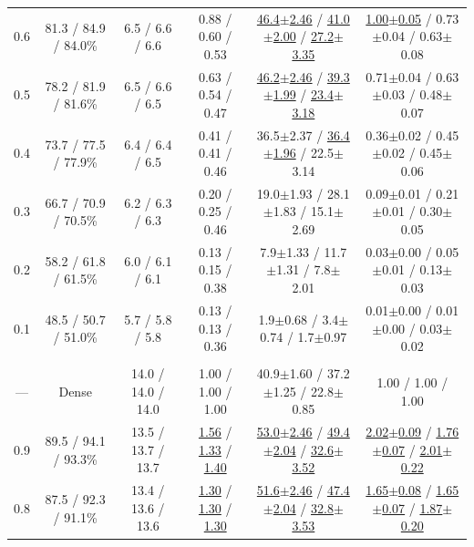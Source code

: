 \begin{table}[!t]
\begin{tabular}{c c c c c c}
0.6 & 81.3 / 84.9 / 84.0\% & 6.5 / 6.6 / 6.6 & 0.88 / 0.60 / 0.53 & \underline{46.4{\scriptsize$\pm$2.46}} / \underline{41.0{\scriptsize$\pm$2.00}} / \underline{27.2{\scriptsize$\pm$3.35}} & \underline{1.00{\scriptsize$\pm$0.05}} / 0.73{\scriptsize$\pm$0.04} / 0.63{\scriptsize$\pm$0.08} \\
0.5 & 78.2 / 81.9 / 81.6\% & 6.5 / 6.6 / 6.5 & 0.63 / 0.54 / 0.47 & \underline{46.2{\scriptsize$\pm$2.46}} / \underline{39.3{\scriptsize$\pm$1.99}} / \underline{23.4{\scriptsize$\pm$3.18}} & 0.71{\scriptsize$\pm$0.04} / 0.63{\scriptsize$\pm$0.03} / 0.48{\scriptsize$\pm$0.07} \\
0.4 & 73.7 / 77.5 / 77.9\% & 6.4 / 6.4 / 6.5 & 0.41 / 0.41 / 0.46 & 36.5{\scriptsize$\pm$2.37} / \underline{36.4{\scriptsize$\pm$1.96}} / 22.5{\scriptsize$\pm$3.14} & 0.36{\scriptsize$\pm$0.02} / 0.45{\scriptsize$\pm$0.02} / 0.45{\scriptsize$\pm$0.06} \\
0.3 & 66.7 / 70.9 / 70.5\% & 6.2 / 6.3 / 6.3 & 0.20 / 0.25 / 0.46 & 19.0{\scriptsize$\pm$1.93} / 28.1{\scriptsize$\pm$1.83} / 15.1{\scriptsize$\pm$2.69} & 0.09{\scriptsize$\pm$0.01} / 0.21{\scriptsize$\pm$0.01} / 0.30{\scriptsize$\pm$0.05} \\
0.2 & 58.2 / 61.8 / 61.5\% & 6.0 / 6.1 / 6.1 & 0.13 / 0.15 / 0.38 & 7.9{\scriptsize$\pm$1.33} / 11.7{\scriptsize$\pm$1.31} / 7.8{\scriptsize$\pm$2.01} & 0.03{\scriptsize$\pm$0.00} / 0.05{\scriptsize$\pm$0.01} / 0.13{\scriptsize$\pm$0.03} \\
0.1 & 48.5 / 50.7 / 51.0\% & 5.7 / 5.8 / 5.8 & 0.13 / 0.13 / 0.36 & 1.9{\scriptsize$\pm$0.68} / 3.4{\scriptsize$\pm$0.74} / 1.7{\scriptsize$\pm$0.97} & 0.01{\scriptsize$\pm$0.00} / 0.01{\scriptsize$\pm$0.00} / 0.03{\scriptsize$\pm$0.02} \\
\addlinespace[0.5pt]
\rowcolor{lightgray} \multicolumn{6}{c}{\rule{0pt}{2.2ex}\textbf{Qwen2.5-14B}\rule[-0.8ex]{0pt}{0pt}} \\
--- & Dense & 14.0 / 14.0 / 14.0 & 1.00 / 1.00 / 1.00 & 40.9{\scriptsize$\pm$1.60} / 37.2{\scriptsize$\pm$1.25} / 22.8{\scriptsize$\pm$0.85} & 1.00 / 1.00 / 1.00 \\
0.9 & 89.5 / 94.1 / 93.3\% & 13.5 / 13.7 / 13.7 & \underline{1.56} / \underline{1.33} / \underline{1.40} & \underline{53.0{\scriptsize$\pm$2.46}} / \underline{49.4{\scriptsize$\pm$2.04}} / \underline{32.6{\scriptsize$\pm$3.52}} & \underline{2.02{\scriptsize$\pm$0.09}} / \underline{1.76{\scriptsize$\pm$0.07}} / \underline{2.01{\scriptsize$\pm$0.22}} \\
0.8 & 87.5 / 92.3 / 91.1\% & 13.4 / 13.6 / 13.6 & \underline{1.30} / \underline{1.30} / \underline{1.30} & \underline{51.6{\scriptsize$\pm$2.46}} / \underline{47.4{\scriptsize$\pm$2.04}} / \underline{32.8{\scriptsize$\pm$3.53}} & \underline{1.65{\scriptsize$\pm$0.08}} / \underline{1.65{\scriptsize$\pm$0.07}} / \underline{1.87{\scriptsize$\pm$0.20}} \\

\end{tabular}
\end{table}
